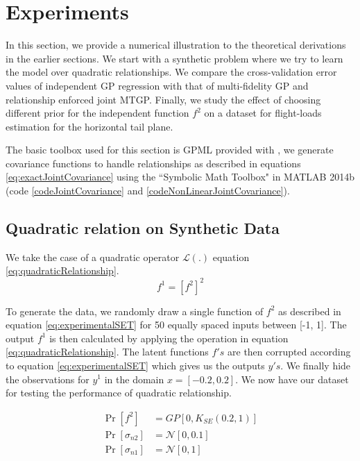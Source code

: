 \section{Experiments}\label{sec:results}
In this section, we provide a numerical illustration to the theoretical derivations in the earlier sections. We start with a synthetic problem where we try to learn the model over quadratic relationships. We compare the cross-validation error values of independent GP regression with that of multi-fidelity GP and relationship enforced joint MTGP. Finally, we study the effect of choosing different prior for the independent function $f^2$ on a dataset for flight-loads estimation for the horizontal tail plane.

The basic toolbox used for this section is GPML provided with \cite{Rasmussen2005}, we generate covariance functions to handle relationships as described in equations \ref{eq:exactJointCovariance} using the ``Symbolic Math Toolbox" in MATLAB 2014b (code \ref{codeJointCovariance} and \ref{codeNonLinearJointCovariance}). 

\subsection{Quadratic relation on Synthetic Data}\label{sub:experimentsSyntheticData}
We take the case of a quadratic operator \(\mathcal{L}(.)\) equation \ref{eq:quadraticRelationship}. 
\begin{equation}\label{eq:quadraticRelationship}
f^{1} = \left [f^{2} \right]^2
\end{equation}

To generate the data, we randomly draw a single function of \(f^{2}\) as described in equation \ref{eq:experimentalSET} for 50 equally spaced inputs between [-1, 1]. The output \(f^{1}\) is then calculated by applying the operation in equation \ref{eq:quadraticRelationship}. The latent functions \(f's\) are then corrupted according to equation \ref{eq:experimentalSET} which gives us the outputs \(y's\). We finally hide the observations for \(y^{1}\) in the domain \(x = [-0.2, 0.2]\). We now have our dataset for testing the performance of quadratic relationship. 

\begin{equation}\label{eq:experimentalSET}
\begin{aligned}
\Pr[f^{2}] & =   GP[0, K_{SE}(0.2, 1)] \\
\Pr[\sigma_{n2}] & = \mathcal{N}[0, 0.1] \\
\Pr[\sigma_{n1}] & = \mathcal{N}[0, 1]
\end{aligned}
\end{equation}
     
